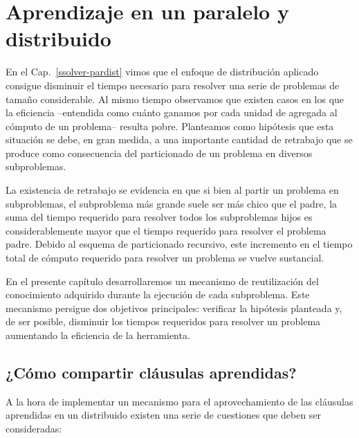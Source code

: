 \chapter{Aprendizaje en un \ssolver paralelo y distribuido}
\label{aprendizaje-pardist}

En el Cap.~\ref{ssolver-pardist} vimos que el enfoque de distribución aplicado
consigue disminuir el tiempo necesario para resolver una serie de problemas de
tamaño considerable. Al mismo tiempo observamos que existen casos en los que
la eficiencia --entendida como cuánto ganamos por cada unidad de \hard
agregada al cómputo de un problema-- resulta pobre. Planteamos como hipótesis
que esta situación se debe, en gran medida, a una importante cantidad de
retrabajo que se produce como consecuencia del particionado de un problema en
diversos subproblemas. 

La existencia de retrabajo se evidencia en que si bien al partir un problema
en subproblemas, el subproblema más grande suele ser más chico que el padre,
la suma del tiempo requerido para resolver todos los subproblemas hijos es
considerablemente mayor que el tiempo requerido para resolver el problema
padre. Debido al esquema de particionado recursivo, este incremento en el
tiempo total de cómputo requerido para resolver un problema se vuelve
sustancial.

En el presente capítulo desarrollaremos un mecanismo de reutilización del
conocimiento adquirido durante la ejecución de cada subproblema. Este
mecanismo persigue dos objetivos principales: verificar la hipótesis planteada
y, de ser posible,  disminuir los tiempos requeridos para resolver un problema
aumentando la eficiencia de la herramienta.

\section{¿Cómo compartir cláusulas aprendidas?}

A la hora de implementar un mecanismo para el aprovechamiento de las cláusulas
aprendidas en un \ssolver distribuido existen una serie de cuestiones que
deben ser consideradas:


